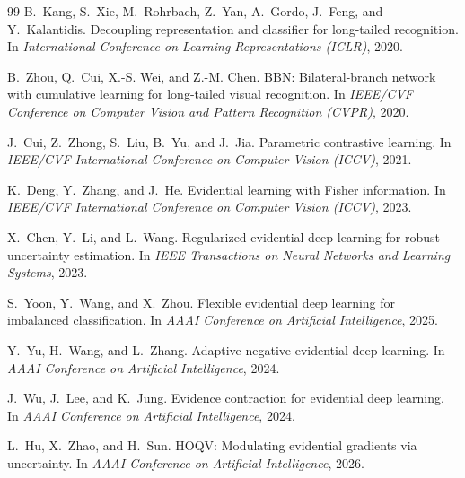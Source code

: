 \documentclass[letterpaper]{article} %
\begin{document}
\begin{thebibliography}{99}
B.~Kang, S.~Xie, M.~Rohrbach, Z.~Yan, A.~Gordo, J.~Feng, and Y.~Kalantidis.
\newblock Decoupling representation and classifier for long-tailed recognition.
\newblock In {\em International Conference on Learning Representations (ICLR)}, 2020.

B.~Zhou, Q.~Cui, X.-S. Wei, and Z.-M. Chen.
\newblock BBN: Bilateral-branch network with cumulative learning for long-tailed visual recognition.
\newblock In {\em IEEE/CVF Conference on Computer Vision and Pattern Recognition (CVPR)}, 2020.

J.~Cui, Z.~Zhong, S.~Liu, B.~Yu, and J.~Jia.
\newblock Parametric contrastive learning.
\newblock In {\em IEEE/CVF International Conference on Computer Vision (ICCV)}, 2021.

K.~Deng, Y.~Zhang, and J.~He.
\newblock Evidential learning with Fisher information.
\newblock In {\em IEEE/CVF International Conference on Computer Vision (ICCV)}, 2023.

X.~Chen, Y.~Li, and L.~Wang.
\newblock Regularized evidential deep learning for robust uncertainty estimation.
\newblock In {\em IEEE Transactions on Neural Networks and Learning Systems}, 2023.

S.~Yoon, Y.~Wang, and X.~Zhou.
\newblock Flexible evidential deep learning for imbalanced classification.
\newblock In {\em AAAI Conference on Artificial Intelligence}, 2025.

Y.~Yu, H.~Wang, and L.~Zhang.
\newblock Adaptive negative evidential deep learning.
\newblock In {\em AAAI Conference on Artificial Intelligence}, 2024.

J.~Wu, J.~Lee, and K.~Jung.
\newblock Evidence contraction for evidential deep learning.
\newblock In {\em AAAI Conference on Artificial Intelligence}, 2024.

L.~Hu, X.~Zhao, and H.~Sun.
\newblock HOQV: Modulating evidential gradients via uncertainty.
\newblock In {\em AAAI Conference on Artificial Intelligence}, 2026.


\end{thebibliography}
\end{document}
